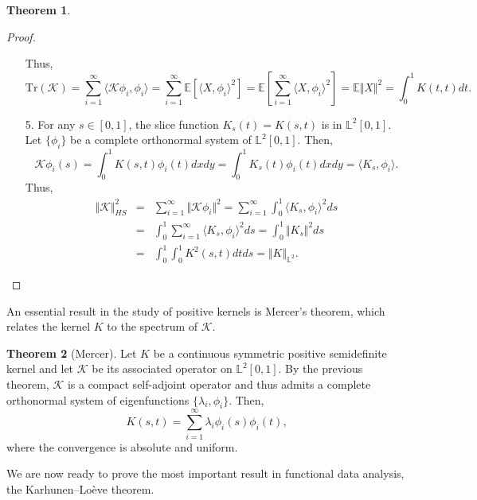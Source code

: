 \documentclass[10pt, a4paper]{report}
\newcommand{\E}[0]{\mathbb{E}}
\newcommand{\Ll}[0]{\mathbb{L}}
\newcommand{\K}[0]{\mathcal{K}}
\theoremstyle{definition}
\newtheorem{theorem}{Theorem}
\theoremstyle{remark}
\begin{document}
\begin{theorem}
\begin{proof}
\begin{itemize}
			Thus, 
			$$\mathrm{Tr}(\K) = \sum_{i=1}^{\infty} \langle \K \phi_i,\phi_i\rangle = \sum_{i=1}^{\infty} \E[\langle X,\phi_i\rangle^2] = \E\left[\sum_{i=1}^{\infty} \langle X,\phi_i\rangle^2\right] = \E\Vert X \Vert^2 = \int_{0}^{1}K(t,t)dt.$$
			\item[5.] For any $s\in [0,1]$, the slice function $K_s(t)=K(s,t)$ is in $\Ll^2[0,1]$. Let $\{\phi_i\}$ be a complete orthonormal system of $\Ll^2[0,1]$. Then, 
			$$\K \phi_i(s) = \int_{0}^1 K(s,t)\phi_i(t)dxdy = \int_{0}^{1}K_s(t)\phi_i(t)dxdy = \langle K_s,\phi_i \rangle.$$
			Thus, 
			\begin{eqnarray*}
				\Vert \K \Vert^2_{HS} & = & \sum_{i=1}^{\infty} \Vert \K \phi_i \Vert^2 = \sum_{i=1}^{\infty} \int_{0}^{1} \langle K_s,\phi_i \rangle^2 ds \\
				& = & \int_{0}^{1} \sum_{i=1}^{\infty} \langle K_s,\phi_i \rangle^2 ds = \int_{0}^{1} \Vert K_s \Vert^2 ds \\
				& = & \int_{0}^{1} \int_{0}^{1} K^2(s,t) dtds = \Vert K \Vert_{\Ll^2}. 
			\end{eqnarray*}
		\end{itemize}
	\end{proof}
\end{theorem}
An essential result in the study of positive kernels is Mercer's theorem, which relates the kernel $K$ to the spectrum of $\K$.
\begin{theorem}[Mercer]
	Let $K$ be a continuous symmetric positive semidefinite kernel and let $\K$ be its associated operator on $\Ll^2[0,1]$. By the previous theorem, $\K$ is a compact self-adjoint operator and thus admits a complete orthonormal system of eigenfunctions $\{\lambda_i,\phi_i\}$. Then, 
	$$K(s,t) = \sum_{i=1}^{\infty} \lambda_i \phi_i(s)\phi_i(t),$$
	where the convergence is absolute and uniform.
\end{theorem}
We are now ready to prove the most important result in functional data analysis, the Karhunen–Loève theorem.
\end{document}
